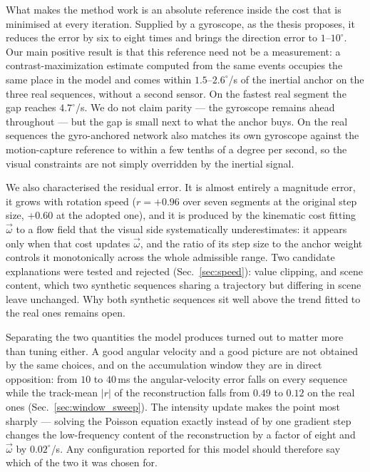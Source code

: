 \documentclass[journal]{IEEEtran}
\newcommand{\wvec}{\vec{\omega}}
\begin{document}
What makes the method work is an absolute reference inside the cost that is
minimised at every iteration. Supplied by a gyroscope, as the thesis proposes,
it reduces the error by six to eight times and brings the direction error to
$1$--$10^\circ$. Our main positive result is that this reference need not be a
measurement: a contrast-maximization estimate computed from the same events
occupies the same place in the model and comes within $1.5$--$2.6^\circ$/s of
the inertial anchor on the three real sequences, without a second sensor.
On the fastest real segment the gap reaches $4.7^\circ$/s. We do not claim parity --- the gyroscope remains ahead
throughout --- but the gap is small next to what the anchor buys. On the real
sequences the gyro-anchored network also matches its own gyroscope against the
motion-capture reference to within a few tenths of a degree per second, so the
visual constraints are not simply overridden by the inertial signal.

We also characterised the residual error. It is almost entirely a magnitude
error, it grows with rotation speed ($r = +0.96$ over seven segments at the
original step size, $+0.60$ at the adopted one), and it is
produced by the kinematic cost fitting $\wvec$ to a flow field that the visual
side systematically underestimates: it appears only when that cost updates
$\wvec$, and the ratio of its step size to the anchor weight controls it
monotonically across the whole admissible range. Two candidate explanations
were tested and rejected (Sec.~\ref{sec:speed}): value clipping, and scene
content, which two synthetic sequences sharing a trajectory but differing in
scene leave unchanged. Why both synthetic sequences sit well above the trend
fitted to the real ones remains open.

Separating the two quantities the model produces turned out to matter more than
tuning either. A good angular velocity and a good picture are not obtained by
the same choices, and on the accumulation window they are in direct opposition:
from $10$ to $40$\,ms the angular-velocity error falls on every sequence while
the track-mean $|r|$ of the reconstruction falls from $0.49$ to $0.12$ on the
real ones (Sec.~\ref{sec:window_sweep}).
The intensity update makes the point most sharply --- solving the Poisson
equation exactly instead of by one gradient step changes the low-frequency
content of the reconstruction by a factor of eight and $\wvec$ by
$0.02^\circ$/s. Any configuration reported for this model should therefore say
which of the two it was chosen for.
\end{document}
